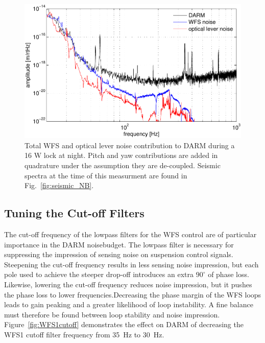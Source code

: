 \begin{figure}
\begin{centering}
\includegraphics[width=1.0\columnwidth]{figures/ASC2DARM.pdf}
\caption[Total WFS and optical lever noise contribution to DARM during
a 16 W lock at night]{Total WFS and optical lever noise contribution
  to DARM during a 16 W lock at night. Pitch and yaw contributions are
  added in quadrature under the assumption they are
  de-coupled. Seismic spectra at the time of this measurment are found
  in Fig.~\ref{fig:seismic_NB}.}
\label{fig:asc2darm}
\end{centering}
\end{figure}





\subsection{Tuning the Cut-off Filters} 
The cut-off frequency of the lowpass filters for the WFS control are
of particular importance in the DARM noisebudget. The lowpass filter
is necessary for suppressing the impression of sensing noise on
suspension control signals. Steepening the cut-off frequency results
in less sensing noise impression, but each pole used to achieve the
steeper drop-off introduces an extra $90^{\circ}$ of phase
loss. Likewise, lowering the cut-off frequency reduces noise
impression, but it pushes the phase loss to lower
frequencies.Decreasing the phase margin of the WFS loops leads to
gain peaking and a greater likelihood of loop instability. A fine
balance must therefore be found between loop stability and noise
impression. Figure~\ref{fig:WFS1cutoff} demonstrates the effect on
DARM of decreasing the WFS1 cutoff filter frequency from 35~Hz to
30~Hz.


